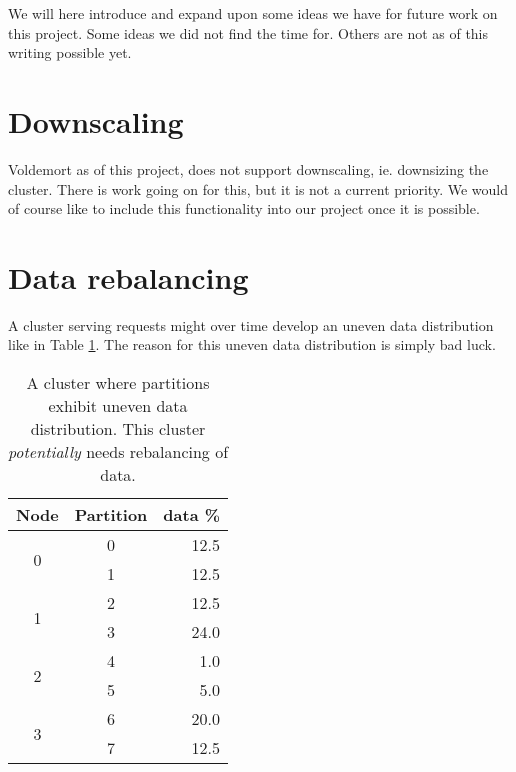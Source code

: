 
We will here introduce and expand upon some ideas we have for future work on this project. Some ideas we did not find the time for. Others are not as of this writing possible yet.

\section{Downscaling}
Voldemort as of this project, does not support downscaling, ie. downsizing the cluster. There is work going on for this, but it is not a current priority. We would of course like to include this functionality into our project once it is possible.

\section{Data rebalancing}
A cluster serving requests might over time develop an uneven data distribution like in Table \ref{tbl:datarebalance}. The reason for this uneven data distribution is simply bad luck. 

\begin{center}
\begin{table}[h]
	\begin{tabular}{|c|c|r|}

		\multicolumn{1}{c}{Node} & 
		\multicolumn{1}{c}{Partition } & 
		\multicolumn{1}{c}{data \%} \\
		\hline

		\multirow{2}{*}{0} & 0 & 12.5 \\ \cline{2-3}
		 & 1 & 12.5 \\
		 \hline
		\multirow{2}{*}{1} & 2 & 12.5 \\ \cline{2-3}
		 & 3 & 24.0 \\
 		 \hline

		\multirow{2}{*}{2} & 4 & 1.0 \\ \cline{2-3}
		 & 5 & 5.0 \\
		
		\hline	
		
		\multirow{2}{*}{3} & 6 & 20.0 \\ \cline{2-3}
		 & 7 & 12.5 \\

		\hline
	\end{tabular}
	\caption{A cluster where partitions exhibit uneven data distribution. This cluster \emph{potentially} needs rebalancing of data.}
	\label{tbl:datarebalance}
\end{table}
\end{center}

